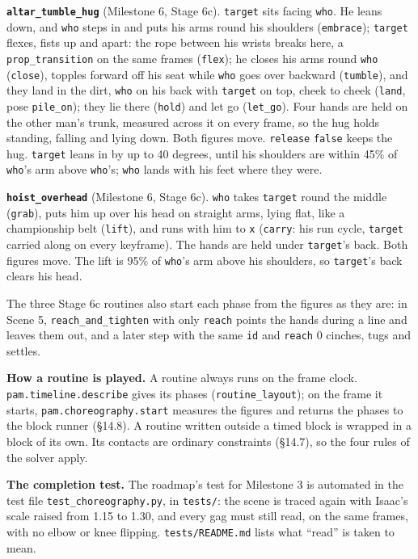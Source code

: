 \documentclass[
  12pt,
  letterpaper,
]{book}
\begin{document}
\textbf{\texttt{altar\_tumble\_hug}} (Milestone 6, Stage 6c).
\texttt{target} sits facing \texttt{who}. He leans down, and
\texttt{who} steps in and puts his arms round his shoulders
(\texttt{embrace}); \texttt{target} flexes, fists up and apart: the
rope between his wrists breaks here, a \texttt{prop\_transition} on the
same frames (\texttt{flex}); he closes his arms round \texttt{who}
(\texttt{close}), topples forward off his seat while \texttt{who} goes
over backward (\texttt{tumble}), and they land in the dirt,
\texttt{who} on his back with \texttt{target} on top, cheek to cheek
(\texttt{land}, pose \texttt{pile\_on}); they lie there
(\texttt{hold}) and let go (\texttt{let\_go}). Four hands are held on
the other man's trunk, measured across it on every frame, so the hug
holds standing, falling and lying down. Both figures move.
\texttt{release} \texttt{false} keeps the hug. \texttt{target} leans
in by up to 40 degrees, until his shoulders are within 45\% of
\texttt{who}'s arm above \texttt{who}'s; \texttt{who} lands with his
feet where they were.

\textbf{\texttt{hoist\_overhead}} (Milestone 6, Stage 6c).
\texttt{who} takes \texttt{target} round the middle (\texttt{grab}),
puts him up over his head on straight arms, lying flat, like a
championship belt (\texttt{lift}), and runs with him to \texttt{x}
(\texttt{carry}: his run cycle, \texttt{target} carried along on every
keyframe). The hands are held under \texttt{target}'s back. Both
figures move. The lift is 95\% of \texttt{who}'s arm above his
shoulders, so \texttt{target}'s back clears his head.

The three Stage 6c routines also start each phase from the figures as
they are: in Scene 5, \texttt{reach\_and\_tighten} with only
\texttt{reach} points the hands during a line and leaves them out, and
a later step with the same \texttt{id} and \texttt{reach} 0 cinches,
tugs and settles.

\textbf{How a routine is played.} A routine always runs on the frame
clock. \texttt{pam.timeline.describe} gives its phases
(\texttt{routine\_layout}); on the frame it starts,
\texttt{pam.choreography.start} measures the figures and returns the
phases to the block runner (\S14.8). A routine written outside a timed
block is wrapped in a block of its own. Its contacts are ordinary
constraints (\S14.7), so the four rules of the solver apply.

\textbf{The completion test.} The roadmap's test for Milestone 3 is
automated in the test file \texttt{test\_choreography.py}, in
\texttt{tests/}: the scene is traced again with Isaac's scale raised from 1.15 to 1.30, and every gag must
still read, on the same frames, with no elbow or knee flipping.
\texttt{tests/README.md} lists what ``read'' is taken to mean.
\end{document}
